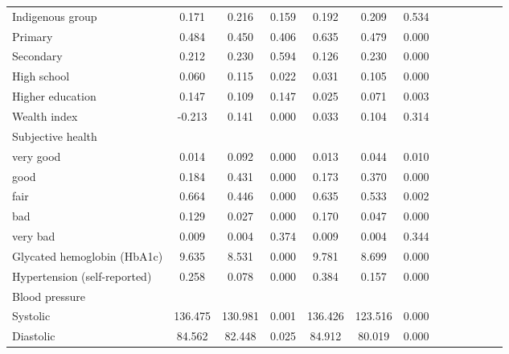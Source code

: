 \documentclass[12pt,english]{article}
\begin{document}
\begin{table}[p]
\begin{center}
\begin{adjustbox}{max width=\linewidth}
\begin{threeparttable}
{\begin{tabular}{l*{6}{S S}}
						Indigenous group    &       0.171&       0.216&       0.159&       0.192&       0.209&       0.534\\
						Primary             &       0.484&       0.450&       0.406&       0.635&       0.479&       0.000\\
						Secondary           &       0.212&       0.230&       0.594&       0.126&       0.230&       0.000\\
						High school         &       0.060&       0.115&       0.022&       0.031&       0.105&       0.000\\
						Higher education    &       0.147&       0.109&       0.147&       0.025&       0.071&       0.003\\
						Wealth index        &      -0.213&       0.141&       0.000&       0.033&       0.104&       0.314\\
						Subjective health       &&&&&&\\
						\hspace*{10mm}very good&       0.014&       0.092&       0.000&       0.013&       0.044&       0.010\\
						\hspace*{10mm}good     &       0.184&       0.431&       0.000&       0.173&       0.370&       0.000\\
						\hspace*{10mm}fair     &       0.664&       0.446&       0.000&       0.635&       0.533&       0.002\\
						\hspace*{10mm}bad      &       0.129&       0.027&       0.000&       0.170&       0.047&       0.000\\
						\hspace*{10mm}very bad &       0.009&       0.004&       0.374&       0.009&       0.004&       0.344\\
						Glycated hemoglobin (HbA1c)&       9.635&       8.531&       0.000&       9.781&       8.699&       0.000\\
						Hypertension (self-reported)       &   0.258&       0.078&       0.000&       0.384&       0.157&       0.000\\
						Blood pressure       &&&&&&\\
						\hspace*{10mm}Systolic             &       136.475&     130.981&       0.001&     136.426&     123.516&       0.000\\
						\hspace*{10mm}Diastolic            &       84.562&      82.448&       0.025&      84.912&      80.019&       0.000\\

\end{tabular}}
\end{threeparttable}
\end{adjustbox}
\end{center}
\end{table}
\end{document}
